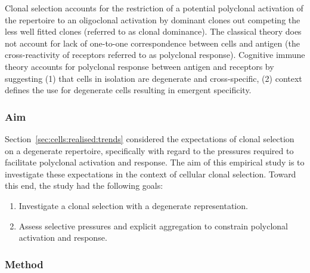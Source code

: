 Clonal selection accounts for the restriction of a potential polyclonal activation of the repertoire to an oligoclonal activation by dominant clones out competing the less well fitted clones (referred to as clonal dominance). The classical theory does not account for lack of one-to-one correspondence between cells and antigen (the cross-reactivity of receptors referred to as polyclonal response). Cognitive immune theory accounts for polyclonal response between antigen and receptors by suggesting (1) that cells in isolation are degenerate and cross-specific, (2) context defines the use for degenerate cells resulting in emergent specificity.

%
%
\subsubsection{Aim}
Section~\ref{sec:cells:realised:trends} considered the expectations of clonal selection on a degenerate repertoire, specifically with regard to the pressures required to facilitate polyclonal activation and response. The aim of this empirical study is to investigate these expectations in the context of cellular clonal selection. 
Toward this end, the study had the following goals:

\begin{enumerate}	
	\item Investigate a clonal selection with a degenerate representation.
	\item Assess selective pressures and explicit aggregation to constrain polyclonal activation and response.	
\end{enumerate}

%
%
\subsubsection{Method}

%
%
